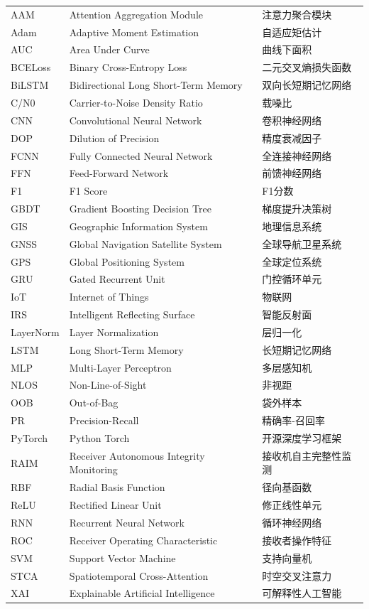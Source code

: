\documentclass[a4paper,AutoFakeBold,openright,12pt]{book}
\begin{document}
\begingroup
\renewcommand{\arraystretch}{1}
\small
\begin{longtable}{@{}p{2.5cm}p{6.5cm}p{4cm}@{}}
AAM & Attention Aggregation Module & 注意力聚合模块 \\
Adam & Adaptive Moment Estimation & 自适应矩估计 \\
AUC & Area Under Curve & 曲线下面积 \\
BCELoss & Binary Cross-Entropy Loss & 二元交叉熵损失函数 \\
BiLSTM & Bidirectional Long Short-Term Memory & 双向长短期记忆网络 \\
C/N0 & Carrier-to-Noise Density Ratio & 载噪比 \\
CNN & Convolutional Neural Network & 卷积神经网络 \\
DOP & Dilution of Precision & 精度衰减因子 \\
FCNN & Fully Connected Neural Network & 全连接神经网络 \\
FFN & Feed-Forward Network & 前馈神经网络 \\
F1 & F1 Score & F1分数 \\
GBDT & Gradient Boosting Decision Tree & 梯度提升决策树 \\
GIS & Geographic Information System & 地理信息系统 \\
GNSS & Global Navigation Satellite System & 全球导航卫星系统 \\
GPS & Global Positioning System & 全球定位系统 \\
GRU & Gated Recurrent Unit & 门控循环单元 \\
IoT & Internet of Things & 物联网 \\
IRS & Intelligent Reflecting Surface & 智能反射面 \\
LayerNorm & Layer Normalization & 层归一化 \\
LSTM & Long Short-Term Memory & 长短期记忆网络 \\
MLP & Multi-Layer Perceptron & 多层感知机 \\
NLOS & Non-Line-of-Sight & 非视距 \\
OOB & Out-of-Bag & 袋外样本 \\
PR & Precision-Recall & 精确率-召回率 \\
PyTorch & Python Torch & 开源深度学习框架 \\
RAIM & Receiver Autonomous Integrity Monitoring & 接收机自主完整性监测 \\
RBF & Radial Basis Function & 径向基函数 \\
ReLU & Rectified Linear Unit & 修正线性单元 \\
RNN & Recurrent Neural Network & 循环神经网络 \\
ROC & Receiver Operating Characteristic & 接收者操作特征 \\
SVM & Support Vector Machine & 支持向量机 \\
STCA & Spatiotemporal Cross-Attention & 时空交叉注意力 \\
XAI & Explainable Artificial Intelligence & 可解释性人工智能 \\
\end{longtable}
\endgroup
\end{document}
